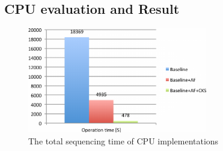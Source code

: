 \subsection{CPU evaluation and Result} 
\begin{figure}[b] \centering
\vspace{0.1in}
\includegraphics[height=1.8in]{./figure/CPU_Result_B.pdf} \vspace{0in}
\caption{The total sequencing time of CPU implementations}
\label{fig:cpu_result} \end{figure}

